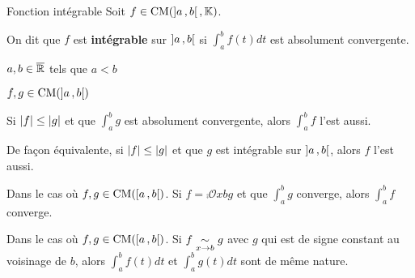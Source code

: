     \begin{defi}{Fonction intégrable}{}
        Soit $f \in \operatorname{CM}(\left] a \, , b \right[, \mathbb{K})$.
    
        On dit que $f$ est \textbf{intégrable} sur $\left] a \, , b \right[$ si $\int_{a}^{b} f(t)dt$ est absolument convergente.
    \end{defi}

    \begin{prop}{}{}
        \begin{soient}
            \begin{multicols}{2}
                \item $a,b \in \overline{\mathbb{R}}$ tels que $a < b$
                \item $f,g \in \operatorname{CM}(\left] a \, , b \right[)$
            \end{multicols}
        \end{soient}
        \begin{alors}
            \item Si $\left\lvert f\right\rvert \leq \left\lvert g\right\rvert$ et que $\int_{a}^{b} g$ est absolument convergente, alors $\int_{a}^{b} f$ l’est aussi.
            \item De façon équivalente, si $\left\lvert f\right\rvert \leq \left\lvert g\right\rvert$ et que $g$ est intégrable sur $\left] a \, , b \right[$, alors $f$ l’est aussi.
            \item Dans le cas où $f,g \in \operatorname{CM}(\left[ a \, , b \right[)$. Si $f = \comp{\mathcal{O}}{x}{b}{g}$ et que $\int_{a}^{b} g$ converge, alors $\int_{a}^{b} f$ converge.
            \item Dans le cas où $f,g \in \operatorname{CM}(\left[ a \, , b \right[)$. Si $f \underset{x \rightarrow b}{\sim} g$ avec $g$ qui est de signe constant au voisinage de $b$, alors $\int_{a}^{b} f(t)dt$ et $\int_{a}^{b} g(t)dt$ sont de même nature. 
        \end{alors}
    \end{prop}


